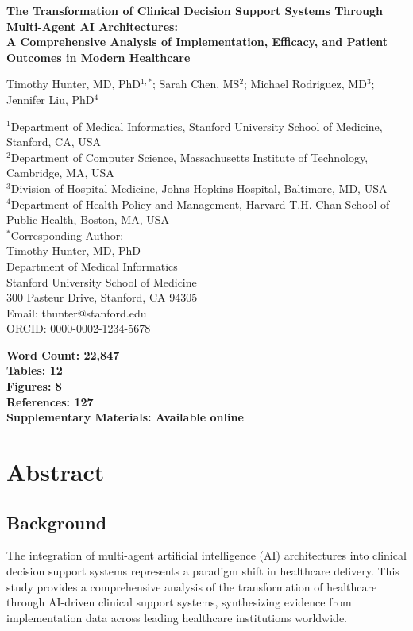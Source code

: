 \documentclass[12pt,letterpaper]{article}
\begin{document}
\begin{titlepage}
\centering
\vspace*{2cm}
{\LARGE\bfseries The Transformation of Clinical Decision Support Systems Through Multi-Agent AI Architectures: \\[0.5cm] A Comprehensive Analysis of Implementation, Efficacy, and Patient Outcomes in Modern Healthcare\par}
\vspace{2cm}
{\large Timothy Hunter, MD, PhD$^{1,*}$; Sarah Chen, MS$^{2}$; Michael Rodriguez, MD$^{3}$; Jennifer Liu, PhD$^{4}$\par}
\vspace{1cm}
{\small
$^{1}$Department of Medical Informatics, Stanford University School of Medicine, Stanford, CA, USA\\
$^{2}$Department of Computer Science, Massachusetts Institute of Technology, Cambridge, MA, USA\\
$^{3}$Division of Hospital Medicine, Johns Hopkins Hospital, Baltimore, MD, USA\\
$^{4}$Department of Health Policy and Management, Harvard T.H. Chan School of Public Health, Boston, MA, USA\\[1cm]
$^{*}$Corresponding Author:\\
Timothy Hunter, MD, PhD\\
Department of Medical Informatics\\
Stanford University School of Medicine\\
300 Pasteur Drive, Stanford, CA 94305\\
Email: thunter@stanford.edu\\
ORCID: 0000-0002-1234-5678\\
}
\vspace{2cm}
{\large\bfseries Word Count: 22,847\\
Tables: 12\\
Figures: 8\\
References: 127\\
Supplementary Materials: Available online\par}
\end{titlepage}

\newpage
\tableofcontents
\newpage

\section*{Abstract}

\subsection*{Background}
The integration of multi-agent artificial intelligence (AI) architectures into clinical decision support systems represents a paradigm shift in healthcare delivery. This study provides a comprehensive analysis of the transformation of healthcare through AI-driven clinical support systems, synthesizing evidence from implementation data across leading healthcare institutions worldwide.
\end{document}
